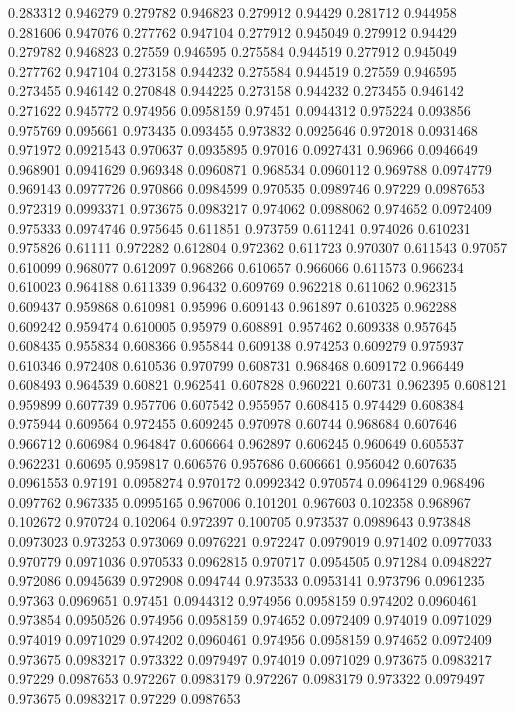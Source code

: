 0.283312 0.946279
0.279782 0.946823
0.279912 0.94429
0.281712 0.944958
0.281606 0.947076
0.277762 0.947104
0.277912 0.945049
0.279912 0.94429
0.279782 0.946823
0.27559 0.946595
0.275584 0.944519
0.277912 0.945049
0.277762 0.947104
0.273158 0.944232
0.275584 0.944519
0.27559 0.946595
0.273455 0.946142
0.270848 0.944225
0.273158 0.944232
0.273455 0.946142
0.271622 0.945772
0.974956 0.0958159
0.97451 0.0944312
0.975224 0.093856
0.975769 0.095661
0.973435 0.093455
0.973832 0.0925646
0.972018 0.0931468
0.971972 0.0921543
0.970637 0.0935895
0.97016 0.0927431
0.96966 0.0946649
0.968901 0.0941629
0.969348 0.0960871
0.968534 0.0960112
0.969788 0.0974779
0.969143 0.0977726
0.970866 0.0984599
0.970535 0.0989746
0.97229 0.0987653
0.972319 0.0993371
0.973675 0.0983217
0.974062 0.0988062
0.974652 0.0972409
0.975333 0.0974746
0.975645 0.611851
0.973759 0.611241
0.974026 0.610231
0.975826 0.61111
0.972282 0.612804
0.972362 0.611723
0.970307 0.611543
0.97057 0.610099
0.968077 0.612097
0.968266 0.610657
0.966066 0.611573
0.966234 0.610023
0.964188 0.611339
0.96432 0.609769
0.962218 0.611062
0.962315 0.609437
0.959868 0.610981
0.95996 0.609143
0.961897 0.610325
0.962288 0.609242
0.959474 0.610005
0.95979 0.608891
0.957462 0.609338
0.957645 0.608435
0.955834 0.608366
0.955844 0.609138
0.974253 0.609279
0.975937 0.610346
0.972408 0.610536
0.970799 0.608731
0.968468 0.609172
0.966449 0.608493
0.964539 0.60821
0.962541 0.607828
0.960221 0.60731
0.962395 0.608121
0.959899 0.607739
0.957706 0.607542
0.955957 0.608415
0.974429 0.608384
0.975944 0.609564
0.972455 0.609245
0.970978 0.60744
0.968684 0.607646
0.966712 0.606984
0.964847 0.606664
0.962897 0.606245
0.960649 0.605537
0.962231 0.60695
0.959817 0.606576
0.957686 0.606661
0.956042 0.607635
0.0961553 0.97191
0.0958274 0.970172
0.0992342 0.970574
0.0964129 0.968496
0.097762 0.967335
0.0995165 0.967006
0.101201 0.967603
0.102358 0.968967
0.102672 0.970724
0.102064 0.972397
0.100705 0.973537
0.0989643 0.973848
0.0973023 0.973253
0.973069 0.0976221
0.972247 0.0979019
0.971402 0.0977033
0.970779 0.0971036
0.970533 0.0962815
0.970717 0.0954505
0.971284 0.0948227
0.972086 0.0945639
0.972908 0.094744
0.973533 0.0953141
0.973796 0.0961235
0.97363 0.0969651
0.97451 0.0944312
0.974956 0.0958159
0.974202 0.0960461
0.973854 0.0950526
0.974956 0.0958159
0.974652 0.0972409
0.974019 0.0971029
0.974019 0.0971029
0.974202 0.0960461
0.974956 0.0958159
0.974652 0.0972409
0.973675 0.0983217
0.973322 0.0979497
0.974019 0.0971029
0.973675 0.0983217
0.97229 0.0987653
0.972267 0.0983179
0.972267 0.0983179
0.973322 0.0979497
0.973675 0.0983217
0.97229 0.0987653
